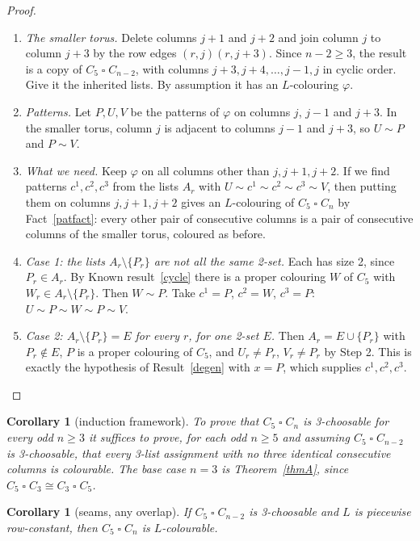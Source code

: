 \documentclass[11pt]{article}
\theoremstyle{plain}
\newtheorem{corollary}[theorem]{Corollary}
\theoremstyle{definition}
\theoremstyle{remark}
\newcommand{\T}{\mathbin{\square}}
\newcommand{\sm}{\setminus}
\newenvironment{steps}[1][]{\begin{enumerate}[label=\textbf{Step \arabic*.},leftmargin=4.4em,itemsep=0.35em,#1]}{\end{enumerate}}
\begin{document}
\begin{proof}
\begin{steps}
\item \emph{The smaller torus.} Delete columns $j+1$ and $j+2$ and join column $j$ to column $j+3$ by the row edges
$(r, j)(r, j+3)$. Since $n - 2 \ge 3$, the result is a copy of $C_5 \T C_{n-2}$, with columns
$j+3, j+4, \dots, j-1, j$ in cyclic order. Give it the inherited lists. By assumption it has an $L$-colouring
$\varphi$.
\item \emph{Patterns.} Let $P, U, V$ be the patterns of $\varphi$ on columns $j$, $j - 1$ and $j + 3$. In the smaller torus,
column $j$ is adjacent to columns $j - 1$ and $j + 3$, so $U \sim P$ and $P \sim V$.
\item \emph{What we need.} Keep $\varphi$ on all columns other than $j, j+1, j+2$. If we find patterns $c^1, c^2, c^3$ from the
lists $A_r$ with $U \sim c^1 \sim c^2 \sim c^3 \sim V$, then putting them on columns $j, j+1, j+2$ gives an $L$-colouring
of $C_5 \T C_n$ by Fact~\ref{patfact}: every other pair of consecutive columns is a pair of consecutive columns of the
smaller torus, coloured as before.
\item \emph{Case 1: the lists $A_r \sm \{P_r\}$ are not all the same 2-set.} Each has size 2, since $P_r \in A_r$. By Known
result~\ref{cycle} there is a proper colouring $W$ of $C_5$ with $W_r \in A_r \sm \{P_r\}$. Then $W \sim P$. Take
$c^1 = P$, $c^2 = W$, $c^3 = P$: $U \sim P \sim W \sim P \sim V$.
\item \emph{Case 2: $A_r \sm \{P_r\} = E$ for every $r$, for one 2-set $E$.} Then $A_r = E \cup \{P_r\}$ with $P_r \notin E$,
$P$ is a proper colouring of $C_5$, and $U_r \ne P_r$, $V_r \ne P_r$ by Step 2. This is exactly the hypothesis of
Result~\ref{degen} with $x = P$, which supplies $c^1, c^2, c^3$. \qedhere
\end{steps}
\end{proof}

\begin{corollary}[induction framework]\label{indframe}
To prove that $C_5 \T C_n$ is 3-choosable for every odd $n \ge 3$ it suffices to prove, for each odd $n \ge 5$ and
assuming $C_5 \T C_{n-2}$ is 3-choosable, that every 3-list assignment with no three identical consecutive columns
is colourable. The base case $n = 3$ is Theorem~\ref{thmA}, since $C_5 \T C_3 \cong C_3 \T C_5$.
\end{corollary}

\begin{corollary}[seams, any overlap]\label{pwrcind}
If $C_5 \T C_{n-2}$ is 3-choosable and $L$ is piecewise row-constant, then $C_5 \T C_n$ is $L$-colourable.
\end{corollary}
\end{document}
